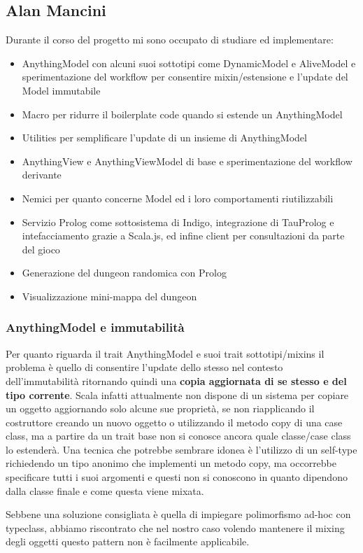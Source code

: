 \subsection{Alan Mancini}
Durante il corso del progetto mi sono occupato di studiare ed implementare:
\begin{itemize}
    \item AnythingModel con alcuni suoi sottotipi come DynamicModel e AliveModel e sperimentazione del workflow per consentire mixin/estensione e l'update del Model immutabile 
    \item Macro per ridurre il boilerplate code quando si estende un AnythingModel
    \item Utilities per semplificare l'update di un insieme di AnythingModel
    \item AnythingView e AnythingViewModel di base e sperimentazione del workflow derivante
    \item Nemici per quanto concerne Model ed i loro comportamenti riutilizzabili
    \item Servizio Prolog come sottosistema di Indigo, integrazione di TauProlog e intefacciamento grazie a Scala.js, ed infine client per consultazioni da parte del gioco
    \item Generazione del dungeon randomica con Prolog
    \item Visualizzazione mini-mappa del dungeon
\end{itemize}
\subsubsection{AnythingModel e immutabilità}
Per quanto riguarda il trait AnythingModel e suoi trait sottotipi/mixins il problema è quello di consentire l'update dello stesso nel contesto dell'immutabilità ritornando quindi una \textbf{copia aggiornata di se stesso e del tipo corrente}. 
Scala infatti attualmente non dispone di un sistema per copiare un oggetto aggiornando solo alcune sue proprietà, se non riapplicando il costruttore creando un nuovo oggetto o utilizzando il metodo copy di una case class, ma a partire da un trait base non si conosce ancora quale classe/case class lo estenderà.
Una tecnica che potrebbe sembrare idonea è l'utilizzo di un self-type richiedendo un tipo anonimo che implementi un metodo copy, ma occorrebbe specificare tutti i suoi argomenti e questi non si conoscono in quanto dipendono dalla classe finale e come questa viene mixata.

Sebbene una soluzione consigliata è quella di impiegare polimorfismo ad-hoc con typeclass, abbiamo riscontrato che nel nostro caso volendo mantenere il mixing degli oggetti questo pattern non è facilmente applicabile.

